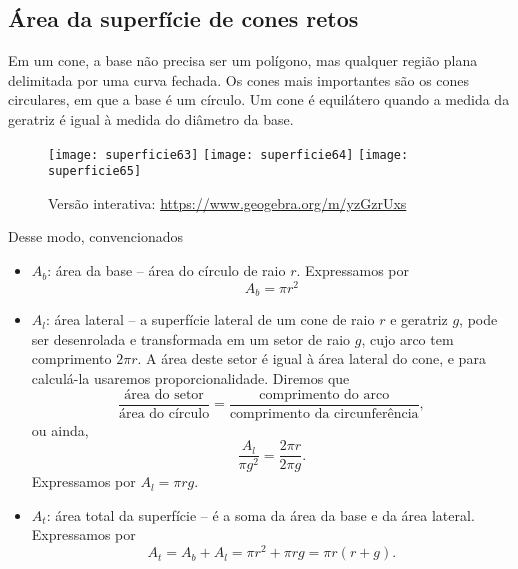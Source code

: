 \subsection{ Área da superfície de cones retos}

Em um cone, a base não precisa ser um polígono, mas qualquer região plana delimitada por uma curva fechada. Os cones mais importantes são os cones circulares, em que a base é um círculo. Um cone é equilátero quando a medida da geratriz é igual à medida do diâmetro da base.

\begin{figure}[H]
\centering

{\texttt{[image: superficie63]}
\hspace{.5em}
\texttt{[image: superficie64]}
\hspace{.5em}
\texttt{[image: superficie65]}}

\caption{Versão interativa: \url{https://www.geogebra.org/m/yzGzrUxs}}
\end{figure}

Desse modo, convencionados

\begin{itemize}
  \item $A_b$: área da base -- área do círculo de raio $r$. Expressamos por
  \begin{equation*}
  A_b=\pi r^2
  \end{equation*}  
  \item $A_l$: área lateral -- a superfície lateral de um cone de raio $r$ e geratriz $g$, pode ser desenrolada e transformada em um setor de raio $g$, cujo arco tem comprimento $2\pi r$. A área deste setor é igual à área lateral do cone, e para calculá-la usaremos proporcionalidade. Diremos que
  \begin{equation*}
  \frac{\text{área do setor}}{\text{área do círculo}}=\frac{\text{comprimento do arco}}{\text{comprimento da circunferência}},
  \end{equation*}
  ou ainda,
  \begin{equation*}
  \frac{A_l}{\pi g^2}=\frac{2\pi r}{2\pi g}.
  \end{equation*}
  Expressamos por $A_l=\pi rg$.
  \item $A_t$: área total da superfície -- é a soma da área da base e da área lateral. Expressamos por
  \begin{equation*}
  A_t=A_b+A_l=\pi r^2+\pi rg=\pi r(r+g).  
  \end{equation*}
\end{itemize}

